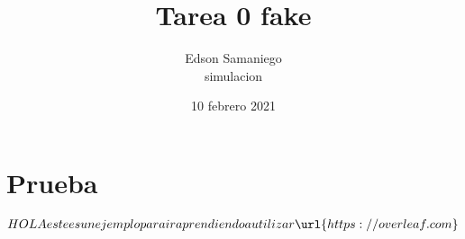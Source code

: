 \documentclass{article}
\title{Tarea 0 fake}
\author{Edson Samaniego \\ simulacion}
\date{10 febrero 2021}
\begin{document}
\maketitle{}

\section{Prueba}
\begin{align}

HOLA este es un ejemplo para ir aprendiendo a utilizar  \url{https://overleaf.com}
\end{align}
\end{document}
